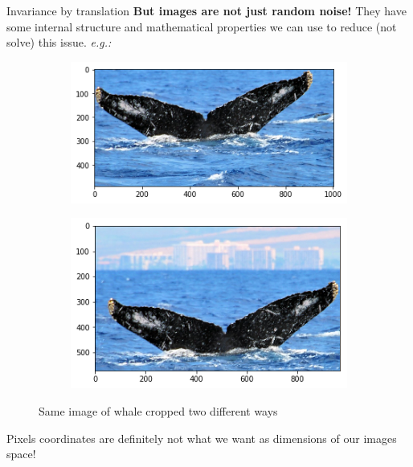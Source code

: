\begin{frame}[c]{Invariance by translation}
    \textbf{But images are not just random noise!} They have some internal structure and mathematical properties we can use to reduce (not solve) this issue. \emph{e.g.:}
    \begin{figure}
        \centering
        \begin{subfigure}[b]{0.4\linewidth}
            \centering
            \includegraphics[width=\linewidth]{001.png}
            \captionsetup{labelformat=empty}
            \caption{}
        \end{subfigure}
        \begin{subfigure}[b]{0.4\linewidth}
            \centering
            \includegraphics[width=\linewidth]{002.png}
            \captionsetup{labelformat=empty}
            \caption{}
        \end{subfigure}
        \caption{Same image of whale cropped two different ways}
    \end{figure}
    Pixels coordinates are definitely not what we want as dimensions of our images space!
\end{frame}

